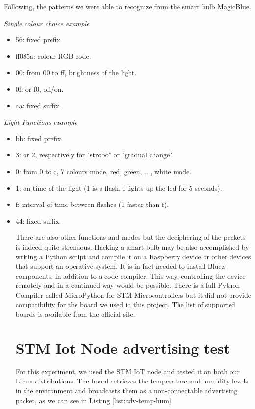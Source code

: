 Following, the patterns we were able to recognize from the smart bulb MagicBlue.

\textit{Single colour choice example}
\begin{itemize}
	\item 56: fixed prefix.
	\item ff085a: colour RGB code.
	\item 00: from 00 to ff, brightness of the light.
	\item 0f: or f0, off/on.
	\item aa: fixed suffix.
\end{itemize}

\textit{Light Functions example}
\begin{itemize}
	\item bb: fixed prefix.
	\item 3: or 2, respectively for "strobo" or "gradual change"
	\item 0: from 0 to c, 7 colours mode, red, green, .. , white mode.
	\item 1: on-time of the light (1 is a flash, f lights up the led for 5 seconds).
	\item f: interval of time between flashes (1 faster than f).
	\item 44: fixed suffix.
	
There are also other functions and modes but the deciphering of the packets is indeed quite strenuous. 
Hacking a smart bulb may be also accomplished by writing a Python script and compile it on a Raspberry device or other devices that support an operative system. It is in fact needed to install Bluez components, in addition to a code compiler.
This way, controlling the device remotely and in a continued way would be possible.
There is a full Python Compiler called MicroPython for STM Microcontrollers but it did not provide compatibility for the board we used in this project.
The list of supported boards is available from the official site.
	
\section{STM Iot Node advertising test}
 
For this experiment, we used the STM IoT node and tested it on both our Linux distributions. The board retrieves the temperature and humidity levels in the environment and broadcasts them as a non-connectable advertising packet, as we can see in Listing \ref{list:adv-temp-hum}.



\end{itemize}
